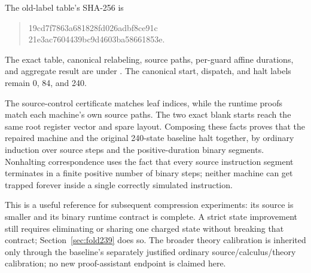 The old-label table's SHA-256 is
\begin{quote}\ttfamily\small
19cd7f7863a681828fd026adbf8ce91c\\
21e3ac7604439bc9d4603ba58661853e.
\end{quote}
The exact table, canonical relabeling, source paths, per-guard affine
durations, and aggregate result are under .  The
canonical start, dispatch, and halt labels remain 0, 84, and 240.

The source-control certificate matches leaf indices, while the runtime
proofs match each machine's own source paths.  The two exact blank starts
reach the same root register vector and spare layout.  Composing these
facts proves that the repaired machine and the original 240-state
baseline halt together, by ordinary induction over source steps and the
positive-duration binary segments.  Nonhalting correspondence uses the
fact that every source instruction segment terminates in a finite
positive number of binary steps; neither machine can get trapped forever
inside a single correctly simulated instruction.

This is a useful reference for subsequent compression experiments: its
source is smaller and its binary runtime contract is complete.  A strict
state improvement still requires eliminating or sharing one charged
state without breaking that contract; Section~\ref{sec:fold239} does so.
The broader theory calibration
is inherited only through the baseline's separately justified ordinary source/calculus/theory calibration;
no new proof-assistant endpoint is claimed here.
